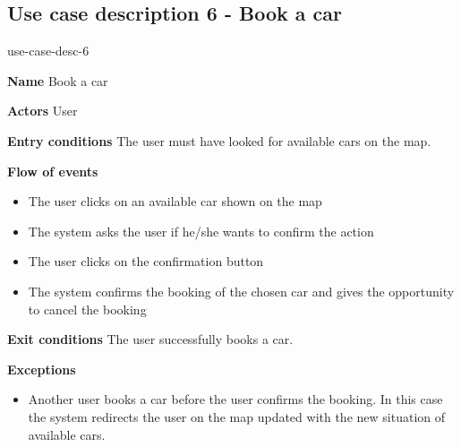 \subsection{Use case description 6 - Book a car}
\begin{labeling}{use-case-desc-6}
		\item[\textbf{Name}] Book a car
		\item[\textbf{Actors}] User
		\item[\textbf{Entry conditions}] The user must have looked for available cars on the map.
		\item[\textbf{Flow of events}]
			\begin{itemize}
				\item[]
				\item The user clicks on an available car shown on the map
				\item The system asks the user if he/she wants to confirm the action
				\item The user clicks on the confirmation button
				\item The system confirms the booking of the chosen car and gives the opportunity to cancel the booking
			\end{itemize}
		\item[\textbf{Exit conditions}] The user successfully books a car.
		\item[\textbf{Exceptions}]
			\begin{itemize}
				\item[]
				\item Another user books a car before the user confirms the booking. In this case the system redirects the user on the map updated with the new situation of available cars.
			\end{itemize}
	\end{labeling}
	
